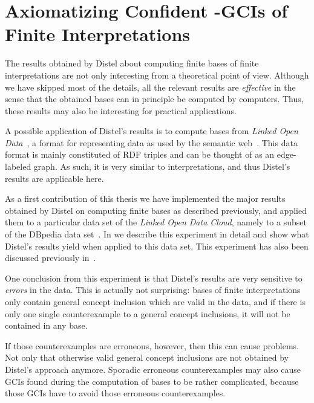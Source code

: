 \chapter{Axiomatizing Confident \EL-GCIs of Finite Interpretations}
\label{cha:axiom-conf-el}

The results obtained by Distel about computing finite bases of finite interpretations are
not only interesting from a theoretical point of view.  Although we have skipped most of
the details, all the relevant results are \emph{effective} in the sense that the obtained
bases can in principle be computed by computers.  Thus, these results may also be
interesting for practical applications.

A possible application of Distel's results is to compute bases from \emph{Linked Open
  Data}~\cite{Linked-Data}, a format for representing data as used by the semantic
web~\cite{journal/sciam/BernersLeeHL01,DBLP:conf/dagstuhl/2003sweb}.  This data format is mainly
constituted of RDF triples and can be thought of as an edge-labeled graph.  As such, it is
very similar to interpretations, and thus Distel's results are applicable here.

As a first contribution of this thesis we have implemented the major results obtained by
Distel on computing finite bases as described previously, and applied them to a particular
data set of the \emph{Linked Open Data Cloud}, namely to a subset of the DBpedia data
set~\cite{DBpedia}.  In  we describe this experiment in
detail and show what Distel's results yield when applied to this data set.  This
experiment has also been discussed previously
in~\cite{Borchmann:confident-GCIs,DBLP:conf/icdm/BorchmannD11}.

One conclusion from this experiment is that Distel's results are very sensitive to
\emph{errors} in the data.  This is actually not surprising: bases of finite
interpretations only contain general concept inclusion which are valid in the data, and if
there is only one single counterexample to a general concept inclusions, it will not be
contained in any base.

If those counterexamples are erroneous, however, then this can cause problems.  Not only
that otherwise valid general concept inclusions are not obtained by Distel's approach
anymore.  Sporadic erroneous counterexamples may also cause GCIs found during the
computation of bases to be rather complicated, because those GCIs have to avoid those
erroneous counterexamples.

